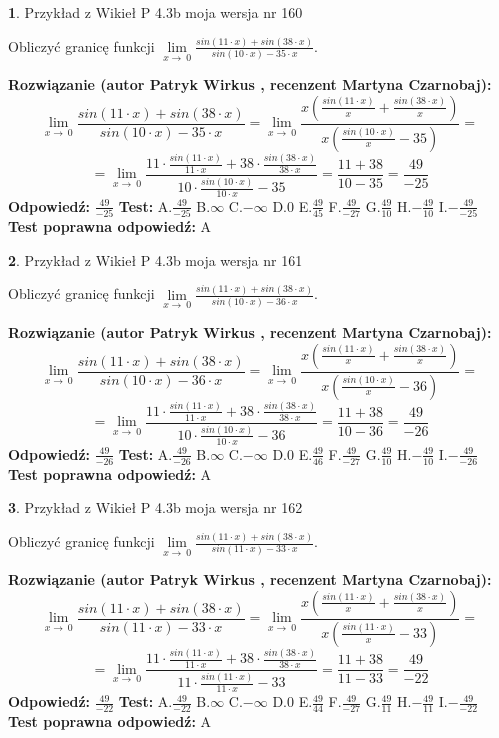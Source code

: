 \documentclass[12pt, a4paper]{article}
\theoremstyle{definition} %
\newtheorem{zad}{}
\newcommand{\zadStart}[1]{\begin{zad}#1\newline}
\newcommand{\zadStop}{\end{zad}}
\newcommand{\rozwStart}[2]{\noindent \textbf{Rozwiązanie (autor #1 , recenzent #2): }\newline}
\newcommand{\rozwStop}{\newline}
\newcommand{\odpStart}{\noindent \textbf{Odpowiedź:}\newline}
\newcommand{\odpStop}{\newline}
\newcommand{\testStart}{\noindent \textbf{Test:}\newline}
\newcommand{\testStop}{\newline}
\newcommand{\kluczStart}{\noindent \textbf{Test poprawna odpowiedź:}\newline}
\newcommand{\kluczStop}{\newline}
\begin{document}
\zadStart{Przykład z Wikieł P 4.3b moja wersja nr 160}


Obliczyć granicę funkcji $\lim\limits_{x\to\ 0}\frac{sin(11 \cdot x)+sin(38 \cdot x)}{sin(10 \cdot x)-35 \cdot x}$.
\zadStop
\rozwStart{Patryk Wirkus}{Martyna Czarnobaj}
$$\lim\limits_{x\to\ 0}\frac{sin(11 \cdot x)+sin(38 \cdot x)}{sin(10 \cdot x)-35 \cdot x}=\lim\limits_{x\to\ 0}\frac{x(\frac{sin(11 \cdot x)}{x}+\frac{sin(38 \cdot x)}{x})}{x(\frac{sin(10 \cdot x)}{x}-35)}=$$
$$=\lim\limits_{x\to\ 0}\frac{11 \cdot \frac{sin(11 \cdot x)}{11 \cdot x}+38 \cdot \frac{sin(38 \cdot x)}{38 \cdot x}}{10 \cdot \frac{sin(10 \cdot x)}{10 \cdot x}-35}=\frac{11+38}{10-35} = \frac{49}{-25}$$
\rozwStop
\odpStart
$\frac{49}{-25}$
\odpStop
\testStart
A.$\frac{49}{-25}$
B.$\infty$
C.$-\infty$
D.$0$
E.$\frac{49}{45}$
F.$\frac{49}{-27}$
G.$\frac{49}{10}$
H.$-\frac{49}{10}$
I.$-\frac{49}{-25}$
\testStop
\kluczStart
A
\kluczStop



\zadStart{Przykład z Wikieł P 4.3b moja wersja nr 161}


Obliczyć granicę funkcji $\lim\limits_{x\to\ 0}\frac{sin(11 \cdot x)+sin(38 \cdot x)}{sin(10 \cdot x)-36 \cdot x}$.
\zadStop
\rozwStart{Patryk Wirkus}{Martyna Czarnobaj}
$$\lim\limits_{x\to\ 0}\frac{sin(11 \cdot x)+sin(38 \cdot x)}{sin(10 \cdot x)-36 \cdot x}=\lim\limits_{x\to\ 0}\frac{x(\frac{sin(11 \cdot x)}{x}+\frac{sin(38 \cdot x)}{x})}{x(\frac{sin(10 \cdot x)}{x}-36)}=$$
$$=\lim\limits_{x\to\ 0}\frac{11 \cdot \frac{sin(11 \cdot x)}{11 \cdot x}+38 \cdot \frac{sin(38 \cdot x)}{38 \cdot x}}{10 \cdot \frac{sin(10 \cdot x)}{10 \cdot x}-36}=\frac{11+38}{10-36} = \frac{49}{-26}$$
\rozwStop
\odpStart
$\frac{49}{-26}$
\odpStop
\testStart
A.$\frac{49}{-26}$
B.$\infty$
C.$-\infty$
D.$0$
E.$\frac{49}{46}$
F.$\frac{49}{-27}$
G.$\frac{49}{10}$
H.$-\frac{49}{10}$
I.$-\frac{49}{-26}$
\testStop
\kluczStart
A
\kluczStop



\zadStart{Przykład z Wikieł P 4.3b moja wersja nr 162}


Obliczyć granicę funkcji $\lim\limits_{x\to\ 0}\frac{sin(11 \cdot x)+sin(38 \cdot x)}{sin(11 \cdot x)-33 \cdot x}$.
\zadStop
\rozwStart{Patryk Wirkus}{Martyna Czarnobaj}
$$\lim\limits_{x\to\ 0}\frac{sin(11 \cdot x)+sin(38 \cdot x)}{sin(11 \cdot x)-33 \cdot x}=\lim\limits_{x\to\ 0}\frac{x(\frac{sin(11 \cdot x)}{x}+\frac{sin(38 \cdot x)}{x})}{x(\frac{sin(11 \cdot x)}{x}-33)}=$$
$$=\lim\limits_{x\to\ 0}\frac{11 \cdot \frac{sin(11 \cdot x)}{11 \cdot x}+38 \cdot \frac{sin(38 \cdot x)}{38 \cdot x}}{11 \cdot \frac{sin(11 \cdot x)}{11 \cdot x}-33}=\frac{11+38}{11-33} = \frac{49}{-22}$$
\rozwStop
\odpStart
$\frac{49}{-22}$
\odpStop
\testStart
A.$\frac{49}{-22}$
B.$\infty$
C.$-\infty$
D.$0$
E.$\frac{49}{44}$
F.$\frac{49}{-27}$
G.$\frac{49}{11}$
H.$-\frac{49}{11}$
I.$-\frac{49}{-22}$
\testStop
\kluczStart
A
\kluczStop
\end{document}
